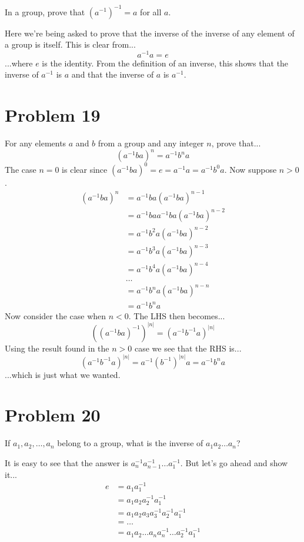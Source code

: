 \documentclass{article}
\begin{document}
In a group, prove that $(a^{-1})^{-1} = a$ for all $a$.

Here we're being asked to prove that the inverse of the inverse of any element of a group is itself.
This is clear from...
\begin{equation*}
a^{-1}a = e
\end{equation*}
...where $e$ is the identity.  From the definition of an inverse, this shows that the inverse
of $a^{-1}$ is $a$ and that the inverse of $a$ is $a^{-1}$.

\section*{Problem 19}

For any elements $a$ and $b$ from a group and any integer $n$, prove that...
\begin{equation*}
(a^{-1}ba)^n=a^{-1}b^na
\end{equation*}
The case $n=0$ is clear since $(a^{-1}ba)^0 = e = a^{-1}a = a^{-1}b^0a$.
Now suppose $n>0$.
\begin{align*}
(a^{-1}ba)^n &= a^{-1}ba(a^{-1}ba)^{n-1} \\
 &= a^{-1}baa^{-1}ba(a^{-1}ba)^{n-2} \\
 &= a^{-1}b^2a(a^{-1}ba)^{n-2} \\
 &= a^{-1}b^3a(a^{-1}ba)^{n-3} \\
 &= a^{-1}b^4a(a^{-1}ba)^{n-4} \\
 &\dots \\
 &= a^{-1}b^na(a^{-1}ba)^{n-n} \\
 &= a^{-1}b^na
\end{align*}
Now consider the case when $n<0$.  The LHS then becomes...
\begin{equation*}
((a^{-1}ba)^{-1})^{|n|} = (a^{-1}b^{-1}a)^{|n|}
\end{equation*}
Using the result found in the $n>0$ case we see that the RHS is...
\begin{equation*}
(a^{-1}b^{-1}a)^{|n|} = a^{-1}(b^{-1})^{|n|}a = a^{-1}b^na
\end{equation*}
...which is just what we wanted.

\section*{Problem 20}

If $a_1,a_2,\dots,a_n$ belong to a group, what is the inverse of $a_1a_2\dots a_n$?

It is easy to see that the answer is $a_n^{-1}a_{n-1}^{-1}\dots a_1^{-1}$.  But let's
go ahead and show it...
\begin{align*}
e &= a_1a_1^{-1} \\
 &= a_1a_2a_2^{-1}a_1^{-1} \\
 &= a_1a_2a_3a_3^{-1}a_2^{-1}a_1^{-1} \\
 &= \dots \\
 &= a_1a_2\dots a_na_n^{-1}\dots a_2^{-1}a_1^{-1}
\end{align*}
\end{document}

